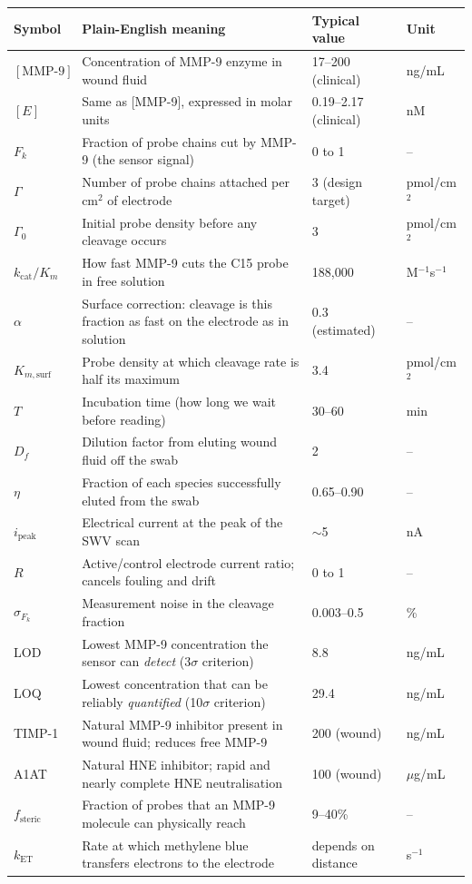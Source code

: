 \documentclass[10pt,a4paper]{article}
\begin{document}
\begin{center}
\begin{tabular}{p{2.4cm}p{6.2cm}p{2.8cm}p{2.0cm}}
\toprule
Symbol & Plain-English meaning & Typical value & Unit \\
\midrule
$[\text{MMP-9}]$ & Concentration of MMP-9 enzyme in wound fluid & 17--200 (clinical) & ng/mL \\
$[E]$ & Same as [MMP-9], expressed in molar units & 0.19--2.17 (clinical) & nM \\
$F_k$ & Fraction of probe chains cut by MMP-9 (the sensor signal) & 0 to 1 & -- \\
$\Gamma$ & Number of probe chains attached per cm$^2$ of electrode & 3 (design target) & pmol/cm$^2$ \\
$\Gamma_0$ & Initial probe density before any cleavage occurs & 3 & pmol/cm$^2$ \\
$k_\text{cat}/K_m$ & How fast MMP-9 cuts the C15 probe in free solution & 188,000 & M$^{-1}$s$^{-1}$ \\
$\alpha$ & Surface correction: cleavage is this fraction as fast on the electrode as in solution & 0.3 (estimated) & -- \\
$K_{m,\text{surf}}$ & Probe density at which cleavage rate is half its maximum & 3.4 & pmol/cm$^2$ \\
$T$ & Incubation time (how long we wait before reading) & 30--60 & min \\
$D_f$ & Dilution factor from eluting wound fluid off the swab & 2 & -- \\
$\eta$ & Fraction of each species successfully eluted from the swab & 0.65--0.90 & -- \\
$i_\text{peak}$ & Electrical current at the peak of the SWV scan & $\sim$5 & nA \\
$R$ & Active/control electrode current ratio; cancels fouling and drift & 0 to 1 & -- \\
$\sigma_{F_k}$ & Measurement noise in the cleavage fraction & 0.003--0.5 & \% \\
LOD & Lowest MMP-9 concentration the sensor can \textit{detect} (3$\sigma$ criterion) & 8.8 & ng/mL \\
LOQ & Lowest concentration that can be reliably \textit{quantified} (10$\sigma$ criterion) & 29.4 & ng/mL \\
TIMP-1 & Natural MMP-9 inhibitor present in wound fluid; reduces free MMP-9 & 200 (wound) & ng/mL \\
A1AT & Natural HNE inhibitor; rapid and nearly complete HNE neutralisation & 100 (wound) & $\mu$g/mL \\
$f_\text{steric}$ & Fraction of probes that an MMP-9 molecule can physically reach & 9--40\% & -- \\
$k_\text{ET}$ & Rate at which methylene blue transfers electrons to the electrode & depends on distance & s$^{-1}$ \\
\bottomrule
\end{tabular}
\end{center}
\end{document}
